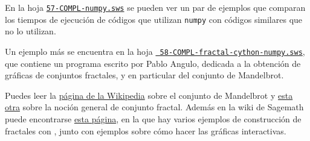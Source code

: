 En la hoja 
\href{http://sage.mat.uam.es:8888/home/pub/14/}{\tt 57-COMPL-numpy.sws}
se pueden ver un par de ejemplos que comparan los tiempos de ejecuci\'on de
c\'odigos que utilizan \lstinline|numpy| con c\'odigos similares que no lo
utilizan.


Un ejemplo m\'as se encuentra en la hoja 
\href{http://sage.mat.uam.es:8888/home/pub/15/}{\tt
58-COMPL-fractal-cython-numpy.sws}, que contiene un programa escrito por Pablo
Angulo, dedicada a la obtenci\'on de gr\'aficas de conjuntos fractales, y en
particular del conjunto de Mandelbrot.

Puedes leer la 
\href{http://en.wikipedia.org/wiki/Mandelbrot_set}{p\'agina de la Wikipedia}
sobre el conjunto de Mandelbrot y 
\href{http://en.wikipedia.org/wiki/Fractal}{esta otra} sobre la noci\'on general
de conjunto fractal.  Adem\'as en la wiki de Sagemath puede encontrarse 
\href{http://wiki.sagemath.org/interact/fractal}{esta p\'agina}, en la que hay
varios ejemplos de construcci\'on de fractales con {\sage}, junto con ejemplos
sobre c\'omo hacer las gr\'aficas interactivas.